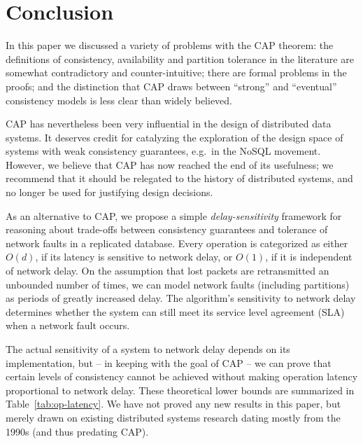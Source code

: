 \documentclass[a4paper,twocolumn,10pt]{article}
\begin{document}

\section{Conclusion}

In this paper we discussed a variety of problems with the CAP theorem: the definitions of
consistency, availability and partition tolerance in the literature are somewhat contradictory and
counter-intuitive; there are formal problems in the proofs; and the distinction that CAP draws
between ``strong'' and ``eventual'' consistency models is less clear than widely believed.

CAP has nevertheless been very influential in the design of distributed data systems. It deserves
credit for catalyzing the exploration of the design space of systems with weak consistency
guarantees, e.g.\ in the NoSQL movement. However, we believe that CAP has now reached the end of its
usefulness; we recommend that it should be relegated to the history of distributed systems, and no
longer be used for justifying design decisions.

As an alternative to CAP, we propose a simple \emph{delay-sensitivity} framework for reasoning about
trade-offs between consistency guarantees and tolerance of network faults in a replicated database.
Every operation is categorized as either $O(d)$, if its latency is sensitive to network delay, or
$O(1)$, if it is independent of network delay. On the assumption that lost packets are retransmitted
an unbounded number of times, we can model network faults (including partitions) as periods of
greatly increased delay. The algorithm's sensitivity to network delay determines whether the system
can still meet its service level agreement (SLA) when a network fault occurs.

The actual sensitivity of a system to network delay depends on its implementation, but -- in keeping
with the goal of CAP -- we can prove that certain levels of consistency cannot be achieved without
making operation latency proportional to network delay. These theoretical lower bounds are
summarized in Table~\ref{tab:op-latency}. We have not proved any new results in this paper, but
merely drawn on existing distributed systems research dating mostly from the 1990s (and thus
predating CAP).
\end{document}
